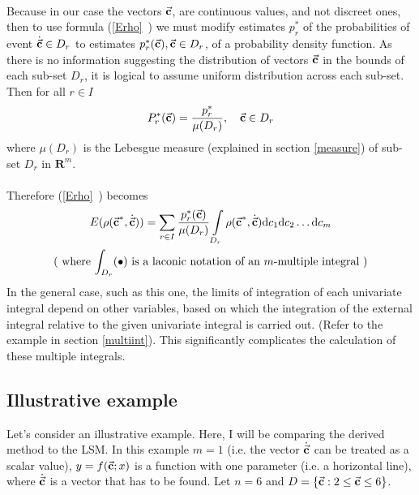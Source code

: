 \\
Because in our case the vectors $\vec{\textbf{c}}$, are continuous values, and not discreet ones, then to use formula (\vref{Erho}~) we must modify estimates $p_{r}^{*}$ of the probabilities of event $\dot{\vec{\textbf{c}}} \in D_{r}$ to estimates $p_{r}^{*}(\vec{\textbf{c}}), \vec{\textbf{c}} \in D_{r}$, of a probability density function. As there is no information suggesting the distribution of vectors $\vec{\textbf{c}}$ in the bounds of each sub-set $D_{r}$, it is logical to assume uniform distribution across each sub-set. Then for all $r \in I$
\begin{equation}
P_{r}^{*}(\vec{\textbf{c}})=\frac{p_{r}^{*}}{\mu(D_{r})}, \quad \vec{\textbf{c}} \in D_{r} \label{posteriori}
\end{equation}
where $\mu(D_{r})$ is the Lebesgue measure (explained in section \vref{measure}) of sub-set $D_{r}$ in $\boldsymbol{R}^{m}$. \\
\\
Therefore (\vref{Erho}~) becomes
\begin{gather}
E(\rho(\vec{\textbf{c}}^{*},\dot{\vec{\textbf{c}}}))=\sum\limits_{r \in I} \frac{p_{r}^{*}(\vec{\textbf{c}})}{\mu(D_{r})} \int\limits_{D_{r}}\rho(\vec{\textbf{c}}^{*},\dot{\vec{\textbf{c}}})\mathrm{d}c_{1}\mathrm{d}c_{2}\dots \mathrm{d}c_{m} \label{mathexpectancy}\\
\nonumber
\text{( where $\int_ {D_{r}}(\bullet)$ is a laconic notation of an $m$-multiple integral )}
\end{gather}
In the general case, such as this one, the limits of integration of each univariate integral depend on other variables, based on which the integration of the external integral relative to the given univariate integral is carried out. \cite{stewart_2008_int} (Refer to the example in section \vref{multiint}). This significantly complicates the calculation of these multiple integrals.

\subsection{Illustrative example}
Let's consider an illustrative example. Here, I will be comparing the derived method to the LSM. In this example $m=1$ (i.e. the vector $\dot{\vec{\textbf{c}}}$ can be treated as a scalar value), $y=f(\vec{\textbf{c}};x)$ is a function with one parameter (i.e. a horizontal line), where $\dot{\vec{\textbf{c}}}$ is a vector that has to be found. Let $n=6$ and $D=\{ \vec{\textbf{c}}: 2 \leq \vec{\textbf{c}} \leq 6 \}$.

